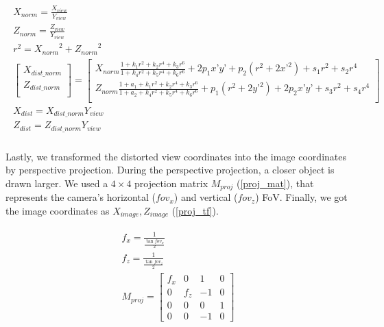 \documentclass{article}
\begin{document}
\begin{gather}
\label{dist_model}
  \begin{gathered}
  X_{norm} = \frac{X_{view}}{Y_{view}} \\
  Z_{norm} = \frac{Z_{view}}{Y_{view}} \\
  r^2 = {X_{norm}}^2 + {Z_{norm}}^2 \\
  \begin{bmatrix}
    X_{dist\_norm} \\ 
    Z_{dist\_norm} \\
  \end{bmatrix} 
  = 
  \begin{bmatrix} 
    X_{norm} \frac{1 + k_1 r^2 + k_2 r^4 + k_3 r^6}{1 + k_4 r^2 + k_5 r^4 + k_6 r^6} + 2 p_1 x’ y’ + p_2(r^2 + 2 x’^2) + s_1 r^2 + s_2 r^4 \\ 
    Z_{norm} \frac{1 + a_1 + k_1 r^2 + k_2 r^4 + k_3 r^6}{1 + a_2 + k_4 r^2 + k_5 r^4 + k_6 r^6} + p_1 (r^2 + 2 y’^2) + 2 p_2 x’ y’ + s_3 r^2 + s_4 r^4 \\    \end{bmatrix} \\
  X_{dist} = X_{dist\_norm} Y_{view} \\
  Z_{dist} = Z_{dist\_norm} Y_{view} \\
  \end{gathered}
\end{gather}

Lastly, we transformed the distorted view coordinates into the image coordinates by perspective projection. During the perspective projection, a closer object is drawn larger. We used a \(4 \times 4\) projection matrix \(M_{proj}\) (\ref{proj_mat}), that represents the camera's horizontal (\(fov_x\)) and vertical (\(fov_z\)) FoV. Finally, we got the image coordinates as \(X_{image}, Z_{image}\) (\ref{proj_tf}).

\begin{gather}
\label{proj_mat}
  \begin{gathered}
  f_x = \frac{1}{\frac{\tan fov_x}{2}} \\
  f_z = \frac{1}{\frac{\tan fov_z}{2}} \\
  M_{proj} = 
  \begin{bmatrix} 
    f_x & 0 & 1 & 0\\ 
    0 & f_z & -1 & 0 \\ 
    0 & 0 & 0 & 1\\ 
    0 & 0 & -1 & 0 
  \end{bmatrix}
  \end{gathered}
\end{gather}
\end{document}
